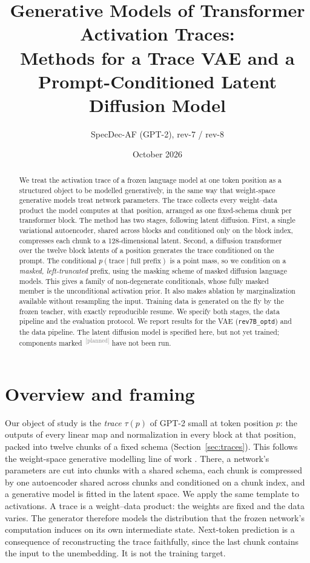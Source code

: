 \documentclass[11pt]{article}
\title{Generative Models of Transformer Activation Traces:\\Methods for a Trace VAE and a Prompt-Conditioned Latent Diffusion Model}
\author{SpecDec-AF (GPT-2), rev-7 / rev-8}
\date{October 2026}
\newcommand{\planned}{\textsuperscript{\textcolor{gray}{\,[planned]}}}
\begin{document}
\maketitle

\begin{abstract}
We treat the activation trace of a frozen language model at one token position as a structured object to be modelled
generatively, in the same way that weight-space generative models treat network parameters. The trace collects every
weight--data product the model computes at that position, arranged as one fixed-schema chunk per transformer block. The
method has two stages, following latent diffusion. First, a single variational autoencoder, shared across blocks and
conditioned only on the block index, compresses each chunk to a 128-dimensional latent. Second, a diffusion transformer
over the twelve block latents of a position generates the trace conditioned on the prompt. The conditional
$p(\text{trace}\mid\text{full prefix})$ is a point mass, so we condition on a \emph{masked, left-truncated} prefix, using
the masking scheme of masked diffusion language models. This gives a family of non-degenerate conditionals, whose fully
masked member is the unconditional activation prior. It also makes ablation by marginalization available without
resampling the input. Training data is generated on the fly by the frozen teacher, with exactly reproducible resume.
We specify both stages, the data pipeline and the evaluation protocol. We report results for the VAE (\texttt{rev7B\_optd})
and the data pipeline. The latent diffusion model is specified here, but not yet trained; components marked
\planned{} have not been run.
\end{abstract}

\section{Overview and framing}
\label{sec:overview}

Our object of study is the \emph{trace} $\tau(p)$ of GPT-2 small \citep{radford2019gpt2} at token position $p$: the outputs of
every linear map and normalization in every block at that position, packed into twelve chunks of a fixed schema
(Section~\ref{sec:traces}). This follows the weight-space generative modelling line of work
\citep{soro2025d2nwg,dwf2026}. There, a network's parameters are cut into chunks with a shared schema, each chunk is
compressed by one autoencoder shared across chunks and conditioned on a chunk index, and a generative model is fitted
in the latent space. We apply the same template to activations. A trace is a weight--data product: the weights are fixed
and the data varies. The generator therefore models the distribution that the frozen network's computation induces on
its own intermediate state. Next-token prediction is a consequence of reconstructing the trace faithfully, since the last
chunk contains the input to the unembedding. It is not the training target.
\end{document}
